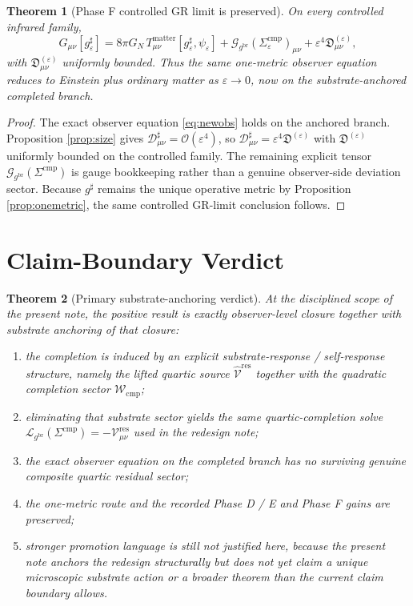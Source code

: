 \documentclass[11pt]{article}
\newcommand{\ObserverMetric}{g^{\mathrm{br}}}
\newcommand{\CompletedMetric}{g^{\sharp}}
\newcommand{\CompShift}{\Sigma^{\mathrm{cmp}}}
\newcommand{\ResidualCore}{\mathcal V_{\mu\nu}^{\mathrm{res}}}
\newcommand{\ResidualLift}{\widehat{\mathcal V}^{\mathrm{res}}}
\newcommand{\CompFunctional}{\mathcal W_{\mathrm{cmp}}}
\newcommand{\ReducedEin}{\mathcal L_{\ObserverMetric}}
\newcommand{\GaugeBook}{\mathcal G_{\ObserverMetric}}
\newcommand{\CompDec}{\mathcal D_{\mu\nu}^{\sharp}}
\newcommand{\epsIR}{\varepsilon}
\newtheorem{theorem}{Theorem}
\begin{document}
\begin{theorem}[Phase F controlled GR limit is preserved]
\label{thm:phaseF}
On every controlled infrared family,
\begin{equation}
G_{\mu\nu}[\CompletedMetric_{\epsIR}]
=
8\pi G_N\,T_{\mu\nu}^{\mathrm{matter}}[\CompletedMetric_{\epsIR},\psi_{\epsIR}]
+\GaugeBook(\CompShift_{\epsIR})_{\mu\nu}
+\epsIR^4\mathfrak D_{\mu\nu}^{(\epsIR)},
\label{eq:phaseFnew}
\end{equation}
with \(\mathfrak D_{\mu\nu}^{(\epsIR)}\) uniformly bounded. Thus the same one-metric observer equation reduces to Einstein plus ordinary matter as \(\epsIR\to0\), now on the substrate-anchored completed branch.
\end{theorem}

\begin{proof}
The exact observer equation \eqref{eq:newobs} holds on the anchored branch. Proposition \ref{prop:size} gives \(\CompDec=\mathcal O(\epsIR^4)\), so \(\CompDec=\epsIR^4\mathfrak D^{(\epsIR)}\) with \(\mathfrak D^{(\epsIR)}\) uniformly bounded on the controlled family. The remaining explicit tensor \(\GaugeBook(\CompShift)\) is gauge bookkeeping rather than a genuine observer-side deviation sector. Because \(\CompletedMetric\) remains the unique operative metric by Proposition \ref{prop:onemetric}, the same controlled GR-limit conclusion follows.
\end{proof}

\section{Claim-Boundary Verdict}

\begin{theorem}[Primary substrate-anchoring verdict]
\label{thm:verdict}
At the disciplined scope of the present note, the positive result is exactly observer-level closure together with substrate anchoring of that closure:
\begin{enumerate}
    \item the completion is induced by an explicit substrate-response / self-response structure, namely the lifted quartic source \(\ResidualLift\) together with the quadratic completion sector \(\CompFunctional\);
    \item eliminating that substrate sector yields the same quartic-completion solve \(\ReducedEin(\CompShift)=-\ResidualCore\) used in the redesign note;
    \item the exact observer equation on the completed branch has no surviving genuine composite quartic residual sector;
    \item the one-metric route and the recorded Phase D / E and Phase F gains are preserved;
    \item stronger promotion language is still not justified here, because the present note anchors the redesign structurally but does not yet claim a unique microscopic substrate action or a broader theorem than the current claim boundary allows.
\end{enumerate}
\end{theorem}
\end{document}
